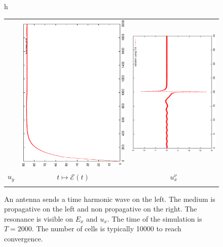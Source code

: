 \begin{figure}{h}
\begin{center}
\begin{tabular}{ccc}
			&
			\includegraphics[angle=-90,width=5.cm]{pics_semilagrange/normes_moit.eps}
			&
			\includegraphics[angle=-90,width=5.cm]{pics_semilagrange/ux_moit.eps}
			\\      
			$u_y$ & $t\mapsto \mathcal E(t)$ & $u_x^\nu$  \\
			
			\\
			
			
		\end{tabular}   \end{center}
		\caption{An antenna sends a time harmonic wave on the left. The medium is propagative
			on the left and non propagative
			on the right. The resonance is visible on $E_x$ and $u_x$. The time of the simulation is $T=2000$. The number of cells
			is typically 10000 to reach convergence.}
		\label{fig:vasl}
	\end{figure}



